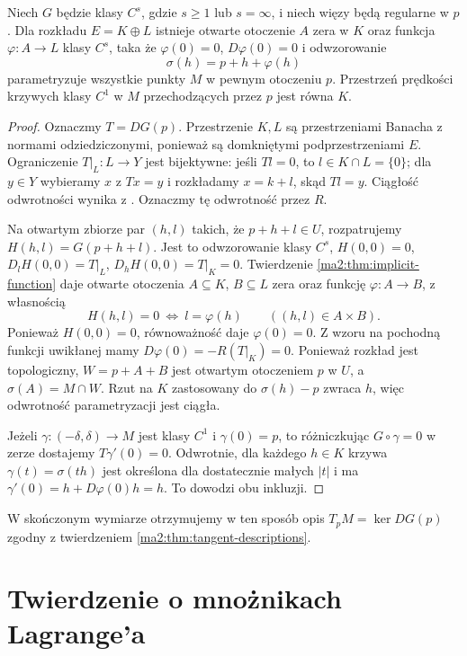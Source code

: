 \begin{stwierdzenie}
\label{ma2:prop:equality-chart}
Niech $G$ będzie klasy $C^s$, gdzie $s\ge1$ lub
$s=\infty$, i niech więzy będą regularne w $p$.
Dla rozkładu $E=K\oplus L$ istnieje otwarte
otoczenie $A$ zera w $K$ oraz funkcja
$\varphi:A\to L$ klasy $C^s$, taka że
$\varphi(0)=0$, $D\varphi(0)=0$ i odwzorowanie
\[
 \sigma(h)=p+h+\varphi(h)
\]
parametryzuje wszystkie punkty $M$ w pewnym otoczeniu
$p$. Przestrzeń prędkości krzywych klasy $C^1$ w $M$
przechodzących przez $p$ jest równa $K$.
\end{stwierdzenie}
\begin{proof}
Oznaczmy $T=DG(p)$. Przestrzenie $K,L$ są przestrzeniami
Banacha z normami odziedziczonymi, ponieważ są domkniętymi
podprzestrzeniami $E$. Ograniczenie $T|_L:L\to Y$ jest
bijektywne: jeśli $Tl=0$, to $l\in K\cap L=\{0\}$;
dla $y\in Y$ wybieramy $x$ z $Tx=y$ i rozkładamy
$x=k+l$, skąd $Tl=y$. Ciągłość odwrotności wynika
z .
Oznaczmy tę odwrotność przez $R$.

Na otwartym zbiorze par $(h,l)$ takich, że $p+h+l\in U$,
rozpatrujemy $H(h,l)=G(p+h+l)$. Jest to odwzorowanie
klasy $C^s$, $H(0,0)=0$,
$D_lH(0,0)=T|_L$, $D_hH(0,0)=T|_K=0$.
Twierdzenie \ref{ma2:thm:implicit-function} daje
otwarte otoczenia $A\subseteq K$, $B\subseteq L$ zera
oraz funkcję $\varphi:A\to B$, z własnością
\[
 H(h,l)=0\ \Longleftrightarrow\ l=\varphi(h)
 \qquad ((h,l)\in A\times B).
\]
Ponieważ $H(0,0)=0$, równoważność daje $\varphi(0)=0$.
Z wzoru na pochodną funkcji uwikłanej mamy
$D\varphi(0)=-R(T|_K)=0$. Ponieważ rozkład jest
topologiczny, $W=p+A+B$ jest otwartym otoczeniem $p$
w $U$, a $\sigma(A)=M\cap W$. Rzut na $K$ zastosowany
do $\sigma(h)-p$ zwraca $h$, więc odwrotność
parametryzacji jest ciągła.

Jeżeli $\gamma:(-\delta,\delta)\to M$ jest klasy $C^1$
i $\gamma(0)=p$, to różniczkując $G\circ\gamma=0$
w zerze dostajemy $T\gamma'(0)=0$. Odwrotnie,
dla każdego $h\in K$ krzywa $\gamma(t)=\sigma(th)$
jest określona dla dostatecznie małych $|t|$ i ma
$\gamma'(0)=h+D\varphi(0)h=h$. To dowodzi obu inkluzji.
\end{proof}

W skończonym wymiarze otrzymujemy w ten sposób opis
$T_pM=\ker DG(p)$ zgodny z
twierdzeniem \ref{ma2:thm:tangent-descriptions}.

\section{Twierdzenie o mnożnikach Lagrange'a}

